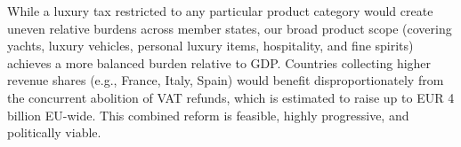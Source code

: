 \documentclass[../../main]{subfiles}
\begin{document}
While a luxury tax restricted to any particular product category would create uneven relative burdens across member states, our broad product scope (covering yachts, luxury vehicles, personal luxury items, hospitality, and fine spirits) achieves a more balanced burden relative to GDP. Countries collecting higher revenue shares (e.g., France, Italy, Spain) would benefit disproportionately from the concurrent abolition of VAT refunds, which is estimated to raise up to EUR 4 billion EU-wide. This combined reform is feasible, highly progressive, and politically viable.
\end{document}
